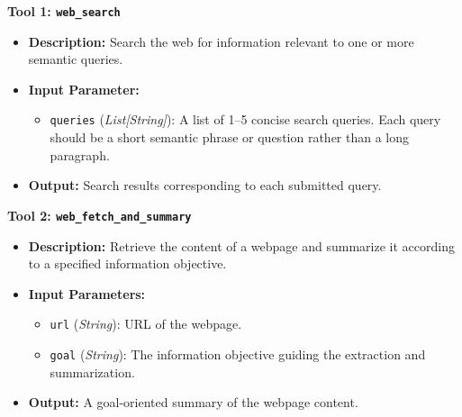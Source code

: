 \documentclass{huawei}
\begin{document}
\begin{tcolorbox}[
    title=\textbf{Available Tools},
    enhanced,
    colback=gray!5,
    colframe=gray!70,
    boxrule=0.8pt,
    arc=2mm,
    left=3mm,
    right=3mm,
    top=2mm,
    bottom=2mm,
    breakable,
    fonttitle=\bfseries
]
\ttfamily
\textbf{Tool 1: \texttt{web\_search}}

\begin{itemize}
    \item \textbf{Description:} Search the web for information relevant to one or more semantic queries.
    \item \textbf{Input Parameter:}
    \begin{itemize}
        \item \texttt{queries} (\emph{List[String]}): A list of 1--5 concise search queries. Each query should be a short semantic phrase or question rather than a long paragraph.
    \end{itemize}
    \item \textbf{Output:} Search results corresponding to each submitted query.
\end{itemize}

\vspace{0.8em}

\textbf{Tool 2: \texttt{web\_fetch\_and\_summary}}

\begin{itemize}
    \item \textbf{Description:} Retrieve the content of a webpage and summarize it according to a specified information objective.
    \item \textbf{Input Parameters:}
    \begin{itemize}
        \item \texttt{url} (\emph{String}): URL of the webpage.
        \item \texttt{goal} (\emph{String}): The information objective guiding the extraction and summarization.
    \end{itemize}
    \item \textbf{Output:} A goal-oriented summary of the webpage content.
\end{itemize}

\end{tcolorbox}
\end{document}

